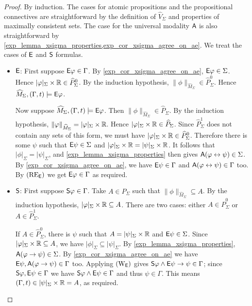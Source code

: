 \begin{proof}
    By induction. The cases for atomic propositions and
    the propositional connectives are straightforward by the definition of
    $\widehat{V}_\Sigma$ and properties of
    maximally consistent sets. The case for the universal modality $\A$ is also
    straightforward by \cref{exp_lemma_xsigma_properties,exp_cor_xsigma_agree_on_ae}.
    We treat the cases of $\E$ and $\S$
    formulas.

    \begin{itemize}
        \item $\E$: First suppose $\E\phi \in \Gamma$. By
    \cref{exp_cor_xsigma_agree_on_ae}, $\E\phi \in \Sigma$. Hence $|\phi|_\Sigma
    \times \R \in \widehat{P}_\Sigma^0$. By the induction hypothesis,
    $\|\phi\|_{\widehat{M}_\Sigma} \in \widehat{P}_\Sigma^0$. Hence
    $\widehat{M}_\Sigma, (\Gamma, t) \models \E\phi$.

    Now suppose $\widehat{M}_\Sigma, (\Gamma, t) \models \E\phi$. Then
    $\|\phi\|_{\widehat{M}_\Sigma} \in \widehat{P}_\Sigma$. By the induction
    hypothesis, $\|\phi\|_{\widehat{M}_\Sigma} = |\phi|_\Sigma \times \R$.
    Hence $|\phi|_\Sigma \times \R \in \widehat{P}_\Sigma$.
    Since $\widehat{P}_\Sigma^1$ does not contain any sets of this form, we
    must have $|\phi|_\Sigma \times \R \in \widehat{P}_\Sigma^0$. Therefore
    there is some $\psi$ such that $\E\psi \in \Sigma$ and $|\phi|_\Sigma
    \times \R = |\psi|_\Sigma \times \R$.  It follows that $|\phi|_\Sigma =
    |\psi|_\Sigma$, and \cref{exp_lemma_xsigma_properties} then gives $\A(\phi
    \liff \psi) \in \Sigma$. By \cref{exp_cor_xsigma_agree_on_ae}, we have $\E\psi
    \in \Gamma$ and $\A(\phi \liff \psi) \in \Gamma$ too. By $\reE$ we get
    $\E\phi \in \Gamma$ as required.

    \item $\S$: First suppose $\S\phi \in \Gamma$. Take $A \in \widehat{P}_\Sigma$
    such that $\|\phi\|_{\widehat{M}_\Sigma} \subseteq A$. By the induction
    hypothesis, $|\phi|_\Sigma \times \R \subseteq A$. There are two cases:
    either $A \in \widehat{P}_\Sigma^0$ or $A \in \widehat{P}_\Sigma^1$.

    If $A \in \widehat{P}_\Sigma^0$, there is $\psi$ such that $A =
    |\psi|_\Sigma \times \R$ and $\E\psi \in \Sigma$.  Since $|\phi|_\Sigma
    \times \R \subseteq A$, we have $|\phi|_\Sigma \subseteq |\psi|_\Sigma$.
    By \cref{exp_lemma_xsigma_properties}, $\A(\phi \limplies \psi) \in \Sigma$. By
    \cref{exp_cor_xsigma_agree_on_ae} we have $\E\psi, \A(\phi \limplies \psi) \in
    \Gamma$ too. Applying $\weakeningE$ gives $\S\phi \land \E\psi \limplies
    \psi \in \Gamma$; since $\S\phi, \E\psi \in \Gamma$ we have $\S\phi \land
    \E\psi \in \Gamma$ and thus $\psi \in \Gamma$. This means $(\Gamma, t) \in
    |\psi|_\Sigma \times \R = A$, as required.


\end{itemize}
\end{proof}
